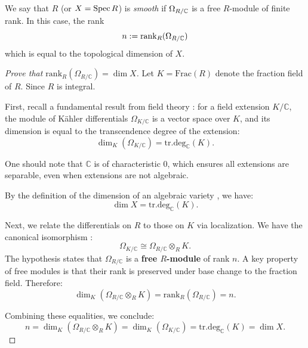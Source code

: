 \begin{definition}[Smoothness]
    We say that $R$ (or $X=\operatorname{Spec} R$) is \emph{smooth} if $\Omega_{R/\mathbb{C}}$ is a free $R$-module of
    finite rank. In this case, the rank
    \[
        n := \operatorname{rank}_R(\Omega_{R/\mathbb{C}})
    \]
    which is equal to the topological dimension of $X$.

    \begin{proof}[Prove that $\mathrm{rank}_R(\Omega_{R/\mathbb{C}}) = \dim X$]
        Let $K = \mathrm{Frac}(R)$ denote the fraction field of $R$. Since $R$ is integral.

        First, recall a fundamental result from field theory \cite[Chapter 2, Proposition 8.6A.]{hartshorne1977algebraic}: for a field extension $K/\mathbb{C}$, the module of Kähler differentials $\Omega_{K/\mathbb{C}}$ is a vector space over $K$, and its dimension is equal to the transcendence degree of the extension:
        \[
            \dim_K (\Omega_{K/\mathbb{C}}) = \mathrm{tr.deg}_{\mathbb{C}}(K).
        \]

        One should note that $\mathbb{C}$ is of characteristic 0, which ensures all extensions are separable, even when extensions are not algebraic.

        By the definition of the dimension of an algebraic variety \cite[Chapter 1, Proposition 1.8A.(a)]{hartshorne1977algebraic}, we have:
        \[
            \dim X = \mathrm{tr.deg}_{\mathbb{C}}(K).
        \]

        Next, we relate the differentials on $R$ to those on $K$ via localization. We have the canonical isomorphism \cite[Chapter 2, Proposition 8.2A.]{hartshorne1977algebraic}:
        \[
            \Omega_{K/\mathbb{C}} \cong \Omega_{R/\mathbb{C}} \otimes_R K.
        \]
        The hypothesis states that $\Omega_{R/\mathbb{C}}$ is a \textbf{free $R$-module} of rank $n$. A key property of free modules is that their rank is preserved under base change to the fraction field. Therefore:
        \[
            \dim_K (\Omega_{R/\mathbb{C}} \otimes_R K) = \mathrm{rank}_R (\Omega_{R/\mathbb{C}}) = n.
        \]

        Combining these equalities, we conclude:
        \[
            n = \dim_K (\Omega_{R/\mathbb{C}} \otimes_R K) = \dim_K (\Omega_{K/\mathbb{C}}) = \mathrm{tr.deg}_{\mathbb{C}}(K) = \dim X.
        \]

    \end{proof}

\end{definition}

